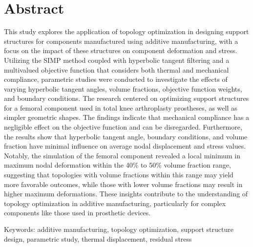 \documentclass[../main.tex]{subfiles}
\begin{document}
\chapter*{Abstract}

 This study explores the application of topology optimization in designing support structures for components manufactured using additive manufacturing, with a focus on the impact of these structures on component deformation and stress. Utilizing the SIMP method coupled with hyperbolic tangent filtering and a multivalued objective function that considers both thermal and mechanical compliance, parametric studies were conducted to investigate the effects of varying hyperbolic tangent angles, volume fractions, objective function weights, and boundary conditions. The research centered on optimizing support structures for a femoral component used in total knee arthroplasty prostheses, as well as simpler geometric shapes. The findings indicate that mechanical compliance has a negligible effect on the objective function and can be disregarded. Furthermore, the results show that hyperbolic tangent angle, boundary conditions, and volume fraction have minimal influence on average nodal displacement and stress values. Notably, the simulation of the femoral component revealed a local minimum in maximum nodal deformation within the 40\% to 50\% volume fraction range, suggesting that topologies with volume fractions within this range may yield more favorable outcomes, while those with lower volume fractions may result in higher maximum deformations. These insights contribute to the understanding of topology optimization in additive manufacturing, particularly for complex components like those used in prosthetic devices.

Keywords: additive manufacturing, topology optimization, support structure design, parametric study, thermal displacement, residual stress
\end{document}
